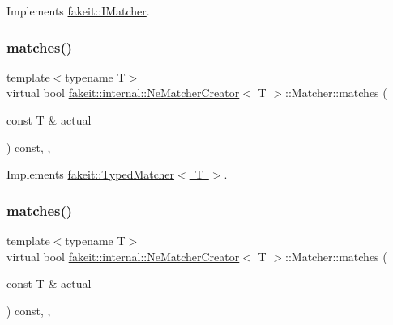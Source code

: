 Implements \mbox{\hyperlink{structfakeit_1_1IMatcher_a409d414a042236dc5e05e241dfd24a67}{fakeit\+::\+I\+Matcher}}.

\mbox{\label{structfakeit_1_1internal_1_1NeMatcherCreator_1_1Matcher_acd3d0aca6309e39ba6b2856f4a2ef920}} 
\subsubsection{\texorpdfstring{matches()}{matches()}\hspace{0.1cm}{\footnotesize\ttfamily [1/9]}}
{\footnotesize\ttfamily template$<$typename T$>$ \\
virtual bool \mbox{\hyperlink{structfakeit_1_1internal_1_1NeMatcherCreator}{fakeit\+::internal\+::\+Ne\+Matcher\+Creator}}$<$ T $>$\+::Matcher\+::matches (\begin{DoxyParamCaption}\item[{const T \&}]{actual }\end{DoxyParamCaption}) const\hspace{0.3cm}{\ttfamily [inline]}, {\ttfamily [override]}, {\ttfamily [virtual]}}



Implements \mbox{\hyperlink{structfakeit_1_1TypedMatcher_ac553bb6ac7c98a489c92fa6ace0f2e2b}{fakeit\+::\+Typed\+Matcher$<$ T $>$}}.

\mbox{\label{structfakeit_1_1internal_1_1NeMatcherCreator_1_1Matcher_acd3d0aca6309e39ba6b2856f4a2ef920}} 
\subsubsection{\texorpdfstring{matches()}{matches()}\hspace{0.1cm}{\footnotesize\ttfamily [2/9]}}
{\footnotesize\ttfamily template$<$typename T$>$ \\
virtual bool \mbox{\hyperlink{structfakeit_1_1internal_1_1NeMatcherCreator}{fakeit\+::internal\+::\+Ne\+Matcher\+Creator}}$<$ T $>$\+::Matcher\+::matches (\begin{DoxyParamCaption}\item[{const T \&}]{actual }\end{DoxyParamCaption}) const\hspace{0.3cm}{\ttfamily [inline]}, {\ttfamily [override]}, {\ttfamily [virtual]}}



